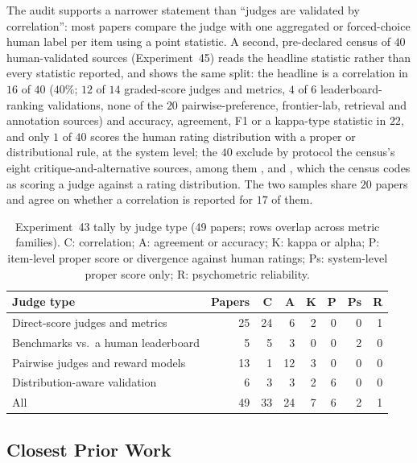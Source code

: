 The audit supports a narrower statement than ``judges are validated by correlation'': most papers compare the judge with one aggregated or forced-choice human label per item using a point statistic.
A second, pre-declared census of $40$ human-validated sources (Experiment~45) reads the headline statistic rather than every statistic reported, and shows the same split: the headline is a correlation in $16$ of $40$ ($40\%$; $12$ of $14$ graded-score judges and metrics, $4$ of $6$ leaderboard-ranking validations, none of the $20$ pairwise-preference, frontier-lab, retrieval and annotation sources) and accuracy, agreement, F1 or a kappa-type statistic in $22$, and only $1$ of $40$ scores the human rating distribution with a proper or distributional rule, at the system level; the $40$ exclude by protocol the census's eight critique-and-alternative sources, among them \citet{elangovan2025beyond}, \citet{li2026judging} and \citet{guerdan2025validating}, which the census codes as scoring a judge against a rating distribution.
The two samples share $20$ papers and agree on whether a correlation is reported for $17$ of them.

\begin{table}[t]
\centering
\caption{Experiment~43 tally by judge type (49 papers; rows overlap across metric families). C: correlation; A: agreement or accuracy; K: kappa or alpha; P: item-level proper score or divergence against human ratings; Ps: system-level proper score only; R: psychometric reliability.}
\label{tab:supp-practice}
\small
\setlength{\tabcolsep}{3pt}
\begin{tabular}{@{}lrrrrrrr@{}}
\hline
Judge type & Papers & C & A & K & P & Ps & R \\
\hline
Direct-score judges and metrics & 25 & 24 & 6 & 2 & 0 & 0 & 1 \\
Benchmarks vs.\ a human leaderboard & 5 & 5 & 3 & 0 & 0 & 2 & 0 \\
Pairwise judges and reward models & 13 & 1 & 12 & 3 & 0 & 0 & 0 \\
Distribution-aware validation & 6 & 3 & 3 & 2 & 6 & 0 & 0 \\
\hline
All & 49 & 33 & 24 & 7 & 6 & 2 & 1 \\
\hline
\end{tabular}
\end{table}

\subsection{Closest Prior Work}
\label{sec:supp-closest}
